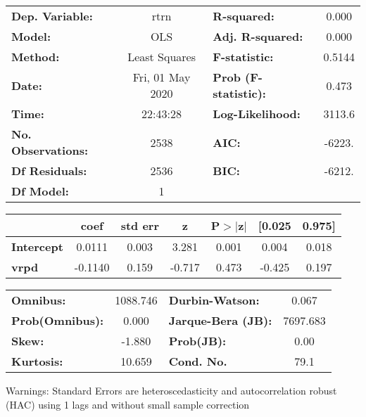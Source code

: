 \begin{center}
\begin{tabular}{lclc}
\toprule
\textbf{Dep. Variable:}    &       rtrn       & \textbf{  R-squared:         } &     0.000   \\
\textbf{Model:}            &       OLS        & \textbf{  Adj. R-squared:    } &     0.000   \\
\textbf{Method:}           &  Least Squares   & \textbf{  F-statistic:       } &    0.5144   \\
\textbf{Date:}             & Fri, 01 May 2020 & \textbf{  Prob (F-statistic):} &    0.473    \\
\textbf{Time:}             &     22:43:28     & \textbf{  Log-Likelihood:    } &    3113.6   \\
\textbf{No. Observations:} &        2538      & \textbf{  AIC:               } &    -6223.   \\
\textbf{Df Residuals:}     &        2536      & \textbf{  BIC:               } &    -6212.   \\
\textbf{Df Model:}         &           1      & \textbf{                     } &             \\
\bottomrule
\end{tabular}
\begin{tabular}{lcccccc}
                   & \textbf{coef} & \textbf{std err} & \textbf{z} & \textbf{P$> |$z$|$} & \textbf{[0.025} & \textbf{0.975]}  \\
\midrule
\textbf{Intercept} &       0.0111  &        0.003     &     3.281  &         0.001        &        0.004    &        0.018     \\
\textbf{vrpd}      &      -0.1140  &        0.159     &    -0.717  &         0.473        &       -0.425    &        0.197     \\
\bottomrule
\end{tabular}
\begin{tabular}{lclc}
\textbf{Omnibus:}       & 1088.746 & \textbf{  Durbin-Watson:     } &    0.067  \\
\textbf{Prob(Omnibus):} &   0.000  & \textbf{  Jarque-Bera (JB):  } & 7697.683  \\
\textbf{Skew:}          &  -1.880  & \textbf{  Prob(JB):          } &     0.00  \\
\textbf{Kurtosis:}      &  10.659  & \textbf{  Cond. No.          } &     79.1  \\
\bottomrule
\end{tabular}
\end{center}

Warnings: \newline
 [1] Standard Errors are heteroscedasticity and autocorrelation robust (HAC) using 1 lags and without small sample correction